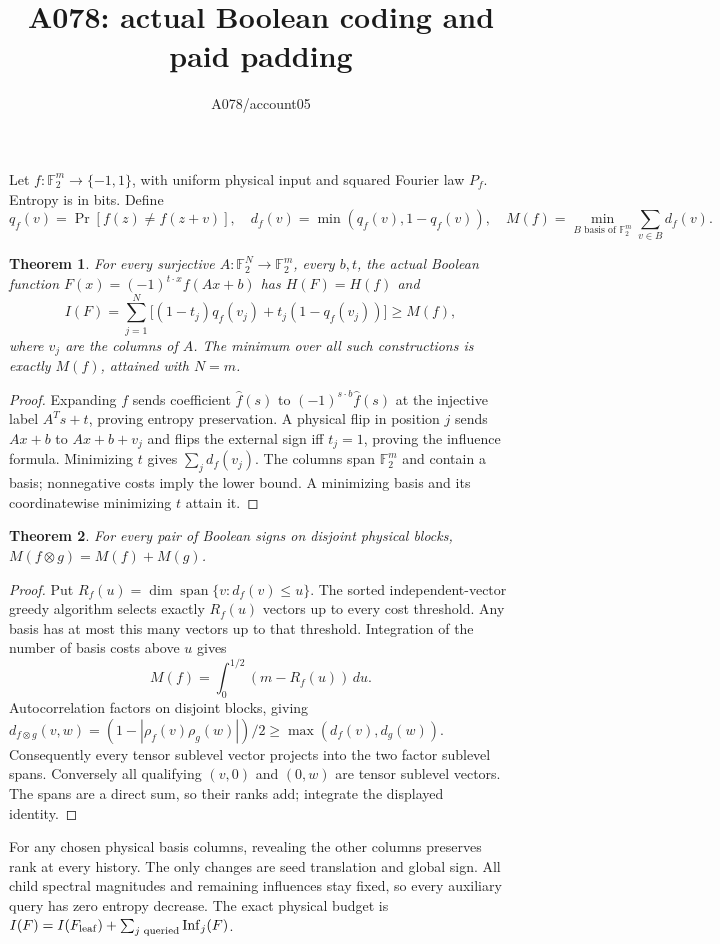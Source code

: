 \documentclass{article}
\newtheorem{theorem}{Theorem}
\newcommand{\F}{\mathbb F_2}
\begin{document}
\title{A078: actual Boolean coding and paid padding}\author{A078/account05}\maketitle
Let $f:\F^m\to\{-1,1\}$, with uniform physical input and squared Fourier law $P_f$. Entropy is in bits. Define
\[
q_f(v)=\Pr[f(z)\ne f(z+v)],\quad
d_f(v)=\min(q_f(v),1-q_f(v)),\quad
M(f)=\min_{B\text{ basis of }\F^m}\sum_{v\in B}d_f(v).
\]
\begin{theorem}
For every surjective $A:\F^N\to\F^m$, every $b,t$, the actual Boolean function
$F(x)=(-1)^{t\cdot x}f(Ax+b)$ has $H(F)=H(f)$ and
\[
I(F)=\sum_{j=1}^N\bigl[(1-t_j)q_f(v_j)+t_j(1-q_f(v_j))\bigr]\ge M(f),
\]
where $v_j$ are the columns of $A$. The minimum over all such constructions is exactly $M(f)$, attained with $N=m$.
\end{theorem}
\begin{proof}
Expanding $f$ sends coefficient $\widehat f(s)$ to
$(-1)^{s\cdot b}\widehat f(s)$ at the injective label $A^Ts+t$, proving entropy preservation. A physical flip in position $j$ sends $Ax+b$ to $Ax+b+v_j$ and flips the external sign iff $t_j=1$, proving the influence formula. Minimizing $t$ gives $\sum_jd_f(v_j)$. The columns span $\F^m$ and contain a basis; nonnegative costs imply the lower bound. A minimizing basis and its coordinatewise minimizing $t$ attain it.
\end{proof}
\begin{theorem}
For every pair of Boolean signs on disjoint physical blocks,
$M(f\otimes g)=M(f)+M(g)$.
\end{theorem}
\begin{proof}
Put $R_f(u)=\dim\operatorname{span}\{v:d_f(v)\le u\}$. The sorted independent-vector greedy algorithm selects exactly $R_f(u)$ vectors up to every cost threshold. Any basis has at most this many vectors up to that threshold. Integration of the number of basis costs above $u$ gives
\[
M(f)=\int_0^{1/2}(m-R_f(u))\,du.
\]
Autocorrelation factors on disjoint blocks, giving
$d_{f\otimes g}(v,w)=(1-|\rho_f(v)\rho_g(w)|)/2\ge\max(d_f(v),d_g(w))$.
Consequently every tensor sublevel vector projects into the two factor sublevel spans. Conversely all qualifying $(v,0)$ and $(0,w)$ are tensor sublevel vectors. The spans are a direct sum, so their ranks add; integrate the displayed identity.
\end{proof}
For any chosen physical basis columns, revealing the other columns preserves rank at every history. The only changes are seed translation and global sign. All child spectral magnitudes and remaining influences stay fixed, so every auxiliary query has zero entropy decrease. The exact physical budget is
$I(F)=I(F_{\rm leaf})+\sum_{j\text{ queried}}\operatorname{Inf}_j(F)$.
\end{document}
